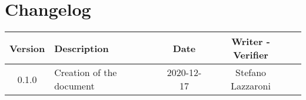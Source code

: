 \section*{Changelog}

\begin{center}
	\begin{longtable}{|c|p{5cm}|c|c|c|}
	\hline
	\rowcolor{lighter-grayer}
	\textbf{Version} & \textbf{Description} & \textbf{Date} & \textbf{Writer - Verifier} \\
	\hline
	\endfirsthead


	\hline
	0.1.0 & Creation of the document & 2020-12-17 & Stefano Lazzaroni\\
	\hline

	\end{longtable}
\end{center}